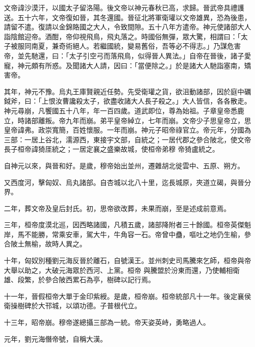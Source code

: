 \begin{pinyinscope}
 文帝諱沙漠汗，以國太子留洛陽。後文帝以神元春秋已高，求歸。晉武帝具禮護送。五十六年，文帝復如晉，其冬還國。晉征北將軍衛瓘以文帝雄異，恐為後患，請留不遣。復請以金錦賂國之大人，令致間隙。五十八年方遣帝。神元使諸部大人詣陰館迎帝。酒酣，帝仰視飛鳥，飛丸落之。時國俗無彈，眾大驚，相謂曰：「太子被服同南夏，兼奇術絕人。若繼國統，變易舊俗，吾等必不得志。」乃謀危害帝，並先馳還，曰：「太子引空弓而落飛鳥，似得晉人異法。」自帝在晉後，諸子愛寵，神元頗有所惑。及聞諸大人請，因曰：「當便除之。」於是諸大人馳詣塞南，矯
 害帝。



 其年，神元不豫。烏丸王庫賢親近任勢。先受衛瓘之貨，欲沮動諸部，因於庭中礪鉞斧，曰：「上恨汝曹讒殺太子，欲盡收諸大人長子殺之。」大人皆信，各各散走。神元尋崩，凡饗國五十八年，年一百四歲。道武即位，尊為始祖。子章皇帝悉鹿立，時諸部離叛。帝九年而崩。弟平皇帝綽立，七年而崩。文帝少子思皇帝立，思皇帝諱弗。政崇寬簡，百姓懷服。一年而崩。神元子昭帝祿官立。帝元年，分國為三部：一居上谷北，濡源西，東接宇文部，自統之；一居代郡之參合陂北，使文帝長子桓帝諱猗厓統之；一居定襄之盛樂故城，使桓帝弟穆
 帝猗盧統之。



 自神元以來，與晉和好。是歲，穆帝始出並州，遷雜胡北徙雲中、五原、朔方。



 又西度河，擊匈奴、烏丸諸部。自杏城以北八十里，迄長城原，夾道立碣，與晉分界。



 二年，葬文帝及皇后封氏。初，思帝欲改葬，未果而崩，至是述成前意焉。



 三年，桓帝度漠北巡，因西略諸國，凡積五歲，諸部降附者三十餘國。桓帝英傑魁岸，馬不能勝，常乘安車，駕大牛，牛角容一石。帝曾中蠱，嘔吐之地仍生榆，參合陂土無榆，故時人異之。



 十年，匈奴別種劉元海反晉於離石，自號漢王。並州刺史司馬騰來乞師，桓帝與帝大舉以助之，大破元海眾於西河、上黨。桓帝
 與騰盟於汾東而還，乃使輔相衛雄、段繁，於參合陂西累石為亭，樹碑以記行焉。



 十一年，晉假桓帝大單于金印紫綬。是歲，桓帝崩。桓帝統部凡十一年。後定襄侯衛操樹碑於大邗城，以頌功德。子普根代立。



 十三年，昭帝崩。穆帝遂總攝三部為一統。帝天姿英峙，勇略過人。



 元年，劉元海僭帝號，自稱大漢。




\end{pinyinscope}
